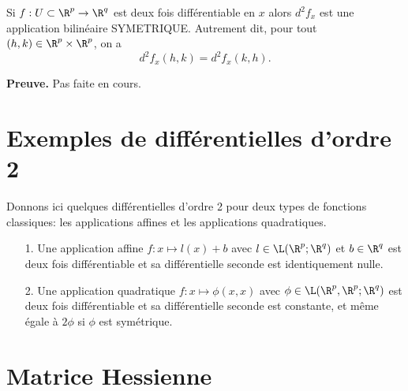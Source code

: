\documentclass[class=report,crop=false]{standalone}
\begin{document}
\begin{theoreme}
\textcolor[rgb]{0.50,0.00,0.25}{ Si $f: U \subset \R^p \rightarrow \R^q$ est deux fois diff\'erentiable en $x$ alors
$d^2f_x$ est une application bilin\'eaire SYMETRIQUE. Autrement dit, pour tout $(h,k)\in \R^p \times \R^p$, on a
\begin{equation*}
  d^2f_x(h,k)=d^2f_x(k,h).
\end{equation*}}
\end{theoreme}

\noindent \textbf{Preuve.} Pas faite en cours.

\section{Exemples de diff\'erentielles d'ordre 2}
Donnons ici quelques différentielles d'ordre 2 pour deux types de fonctions classiques: les applications affines et les applications quadratiques. 

\begin{itemize}
  \item[1.] Une application affine $f:x \mapsto l(x)+b$ avec $l \in \L(\R^p;\R^q)$ et $b \in \R^q$
est deux fois diff\'erentiable et sa diff\'erentielle seconde est identiquement nulle.
 \item[2.] Une application quadratique $f: x \mapsto \phi(x,x)$ avec $\phi \in \L(\R^p,\R^p;\R^q)$
est deux fois diff\'erentiable et sa diff\'erentielle seconde est constante, et m\^eme \'egale \`a $2\phi$ si
$\phi$ est sym\'etrique.
\end{itemize}

\section{Matrice Hessienne}
\end{document}
